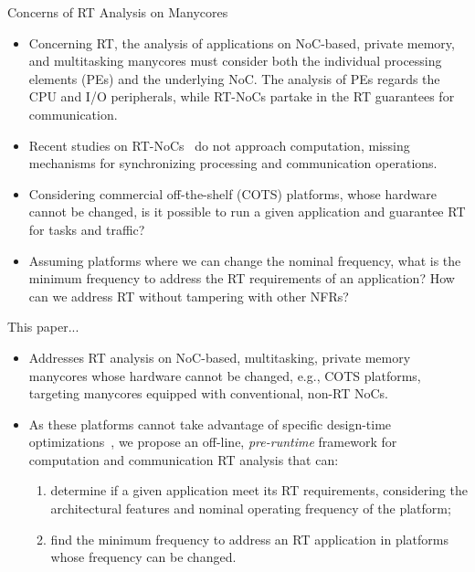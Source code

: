 \begin{frame}{Concerns of RT Analysis on Manycores}
	\begin{itemize}
		\item Concerning RT, the analysis of applications on NoC-based, private memory, and multitasking manycores must consider both the individual processing elements (PEs) and the underlying NoC. The analysis of PEs regards the CPU and I/O peripherals, while RT-NoCs partake in the RT guarantees for communication. 
		
		\item Recent studies on RT-NoCs~\cite{Deniziak:2018, chen:2020, Picornell:2019} do not approach computation, missing mechanisms for synchronizing processing and communication operations. 
		
		\item Considering commercial off-the-shelf (COTS) platforms, whose hardware cannot be changed, is it possible to run a given application and guarantee RT for tasks and traffic? 
		
		\item Assuming platforms where we can change the nominal frequency, what is the minimum frequency to address the RT requirements of an application? How can we address RT without tampering with other NFRs?
	\end{itemize}
\end{frame}


\begin{frame}{This paper...}
	\begin{itemize}
		\item Addresses RT analysis on NoC-based, multitasking, private memory manycores whose hardware cannot be changed, e.g., COTS platforms, targeting manycores equipped with conventional, non-RT NoCs. 
		
		\item As these platforms cannot take advantage of specific design-time optimizations~\cite{Esperanto,Bohnenstiehl}, we propose an off-line, \textit{pre-runtime} framework for computation and communication RT analysis that can:%
		
		\begin{enumerate}
			\item determine if a given application meet its RT requirements, considering the architectural features and nominal operating frequency of the platform;
			\item find the minimum frequency to address an RT application in platforms whose frequency can be changed.   
		\end{enumerate}
		
	\end{itemize}
\end{frame}

